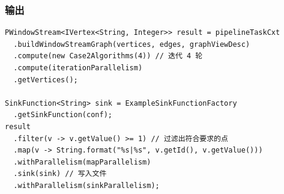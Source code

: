 \subsubsection{输出}
\begin{center}
\begin{verbatim}
PWindowStream<IVertex<String, Integer>> result = pipelineTaskCxt
  .buildWindowStreamGraph(vertices, edges, graphViewDesc)
  .compute(new Case2Algorithms(4)) // 迭代 4 轮
  .compute(iterationParallelism)
  .getVertices();

SinkFunction<String> sink = ExampleSinkFunctionFactory
  .getSinkFunction(conf);
result
  .filter(v -> v.getValue() >= 1) // 过滤出符合要求的点
  .map(v -> String.format("%s|%s", v.getId(), v.getValue()))
  .withParallelism(mapParallelism)
  .sink(sink) // 写入文件
  .withParallelism(sinkParallelism);
\end{verbatim}
\end{center}
